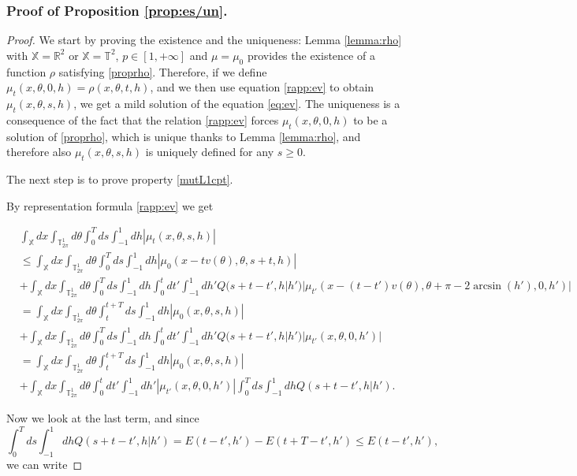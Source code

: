 \documentclass[a4paper,10pt,reqno]{amsart}
\numberwithin{equation}{subsection}
\numberwithin{figure}{subsection}
\begin{document}
\subsubsection{Proof of Proposition \ref{prop:es/un}.}
\begin{proof}
We start by proving the existence and the uniqueness: Lemma \ref{lemma:rho} with $\mathbb{X}=\mathbb{R}^2$ or $\mathbb{X}=\mathbb{T}^2$, $p\in[1,+\infty]$ and $\mu=\mu_0$ provides the existence of a function $\rho$ satisfying \eqref{proprho}. Therefore, if we define $\mu_t(x,\theta,0,h)=\rho(x,\theta,t,h)$, and we then use equation \eqref{rapp:ev} to obtain $\mu_t(x,\theta,s,h)$, we get a mild solution of the equation \eqref{eq:ev}. The uniqueness is a consequence of the fact that the relation \eqref{rapp:ev} forces $\mu_t(x,\theta,0,h)$ to be a solution of \eqref{proprho}, which is unique thanks to Lemma \ref{lemma:rho}, and therefore also $\mu_t(x,\theta,s,h)$ is uniquely defined for any $s\geq0$.

The next step is to prove property \eqref{mutL1cpt}.

By representation formula \eqref{rapp:ev} we get

{\tiny\begin{align*}
&\int_{\mathbb{X}}dx\int_{\mathbb{T}^1_{2\pi}}d\theta\int_0^Tds\int_{-1}^1dh|\mu_t(x,\theta,s,h)|
\\
&\leq\int_{\mathbb{X}}dx\int_{\mathbb{T}^1_{2\pi}}d\theta\int_0^Tds\int_{-1}^1dh|\mu_0(x-tv(\theta),\theta,s+t,h)|
\\
&+\int_{\mathbb{X}}dx\int_{\mathbb{T}^1_{2\pi}}d\theta\int_0^Tds\int_{-1}^1dh\int_0^tdt'\int_{-1}^1dh' Q(s+t-t',h|h')|\mu_{t'}(x-(t-t')v(\theta),\theta+\pi-2\arcsin(h'),0,h')|
\\
&=\int_{\mathbb{X}}dx\int_{\mathbb{T}^1_{2\pi}}d\theta\int_t^{t+T}ds\int_{-1}^1dh|\mu_0(x,\theta,s,h)|
\\
&+\int_{\mathbb{X}}dx\int_{\mathbb{T}^1_{2\pi}}d\theta\int_0^Tds\int_{-1}^1dh\int_0^tdt'\int_{-1}^1dh' Q(s+t-t',h|h')|\mu_{t'}(x,\theta,0,h')|
\\
&=\int_{\mathbb{X}}dx\int_{\mathbb{T}^1_{2\pi}}d\theta\int_t^{t+T}ds\int_{-1}^1dh|\mu_0(x,\theta,s,h)|
\\
&+\int_{\mathbb{X}}dx\int_{\mathbb{T}^1_{2\pi}}d\theta\int_0^tdt'\int_{-1}^1dh' |\mu_{t'}(x,\theta,0,h')|\int_0^Tds\int_{-1}^1dhQ(s+t-t',h|h').
\end{align*}}

Now we look at the last term, and since
\[
\int_0^Tds\int_{-1}^1dhQ(s+t-t',h|h')=E(t-t',h')-E(t+T-t',h')\leq E(t-t',h'),
\]
we can write


\end{proof}
\end{document}
